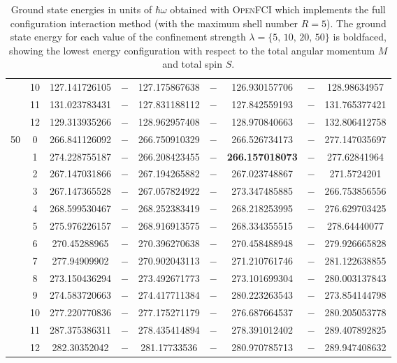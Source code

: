 \begin{table}[ht]
{\begin{tabular}{c|c|c|c|c|c|c|c|c}
& 10 & 127.141726105& $-$& 127.175867638& $-$& 126.930157706& $-$& 128.98634957\\ 
& 11 & 131.023783431& $-$& 127.831188112& $-$& 127.842559193& $-$& 131.765377421\\ 
& 12 & 129.313935266& $-$& 128.962957408& $-$& 128.970840663& $-$& 132.806412758\\ 
\hline                    %
\multirow{13}{*}{50} & 0 & 266.841126092& $-$& 266.750910329& $-$& 266.526734173& $-$& 277.147035697\\ 
& 1 & 274.228755187& $-$& 266.208423455& $-$& \textbf{266.157018073}& $-$& 277.62841964\\ 
& 2 & 267.147031866& $-$& 267.194265882& $-$& 267.023748867& $-$& 271.5724201\\ 
& 3 & 267.147365528& $-$& 267.057824922& $-$& 273.347485885& $-$& 266.753856556\\ 
& 4 & 268.599530467& $-$& 268.252383419& $-$& 268.218253995& $-$& 276.629703425\\ 
& 5 & 275.976226157& $-$& 268.916913575& $-$& 268.334355515& $-$& 278.64440077\\ 
& 6 & 270.45288965& $-$& 270.396270638& $-$& 270.458488948& $-$& 279.926665828\\ 
& 7 & 277.94909902& $-$& 270.902043113& $-$& 271.210761746& $-$& 281.122638855\\ 
& 8 & 273.150436294& $-$& 273.492671773& $-$& 273.101699304& $-$& 280.003137843\\ 
& 9 & 274.583720663& $-$& 274.417711384& $-$& 280.223263543& $-$& 273.854144798\\ 
& 10 & 277.220770836& $-$& 277.175271179& $-$& 276.687664537& $-$& 280.205053778\\ 
& 11 & 287.375386311& $-$& 278.435414894& $-$& 278.391012402& $-$& 289.407892825\\ 
& 12 & 282.30352042& $-$& 281.17733536& $-$& 280.970785713& $-$& 289.947408632 \\
\toprule[1pt]
\end{tabular}
}
 \caption{Ground state energies in units of $\hbar \omega$ obtained with \textsc{OpenFCI} which implements the full configuration interaction method (with the maximum shell number $R=5$). The ground state energy for each value of the confinement strength $\lambda=\{5,\,10,\,20,\,50\}$ is boldfaced, showing the lowest energy configuration with respect to the total angular momentum $M$ and total spin $S$.}
\label{table:GSfci2} 
\end{table} 
\clearpage

